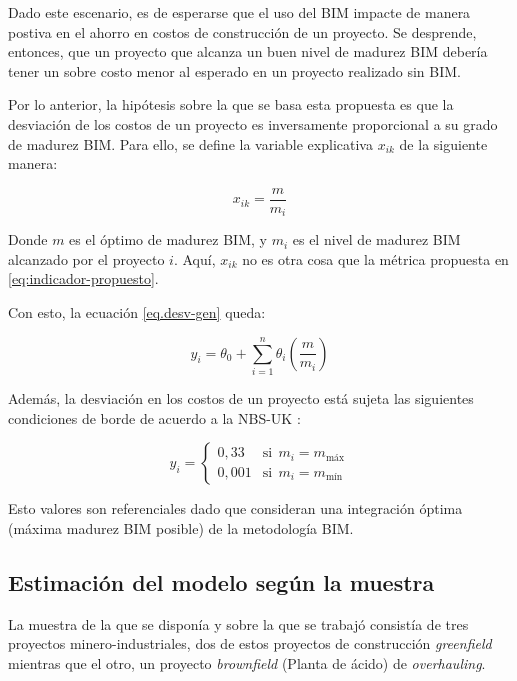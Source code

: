 Dado este escenario, es de esperarse que el uso del BIM impacte de manera postiva en el ahorro en costos de construcción de un proyecto. Se desprende, entonces, que un proyecto que alcanza un buen nivel de madurez BIM debería tener un sobre costo menor al esperado en un proyecto realizado sin BIM.

Por lo anterior, la hipótesis sobre la que se basa esta propuesta es que la desviación de los costos de un proyecto es inversamente proporcional a su grado de madurez BIM. Para ello, se define la variable explicativa $x_{ik}$ de la siguiente manera:

\begin{equation}
    x_{ik} = \frac{m}{m_i}
\end{equation}

Donde $m$ es el óptimo de madurez BIM, y $m_i$ es el nivel de madurez BIM alcanzado por el proyecto $i$. Aquí, $x_{ik}$ no es otra cosa que la métrica propuesta en \eqref{eq:indicador-propuesto}.

Con esto, la ecuación \eqref{eq.desv-gen} queda:

\begin{equation}
    \label{eq:modelo-propuesto}
    y_i = \theta_0 + \sum\limits_{i=1}^n \theta_i \left(\frac{m}{m_i} \right)
\end{equation}

Además, la desviación en los costos de un proyecto está sujeta las siguientes condiciones de borde de acuerdo a la NBS-UK \cite{nbs}:

\begin{equation}
    y_i = 
    \begin{cases}
        0,33 & \text{si}~~ m_i = m_{\text{máx}} \\
        0,001 & \text{si}~~ m_i = m_{\text{mín}}
    \end{cases}
\end{equation}

Esto valores son referenciales dado que consideran una integración óptima (máxima madurez BIM posible) de la metodología BIM.


\subsection{Estimación del modelo según la muestra}

La muestra de la que se disponía y sobre la que se trabajó consistía de tres proyectos minero-industriales, dos de estos proyectos de construcción \emph{greenfield} mientras que el otro, un proyecto \emph{brownfield} (Planta de ácido) de \emph{overhauling}.

